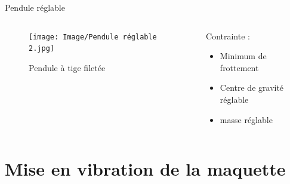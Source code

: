 \documentclass{beamer}
\begin{document}
\begin{frame}{Pendule réglable}
	\begin{columns}
		
	\begin{column}{0.35\textwidth}
		
	
	\begin{figure}
		\texttt{[image: Image/Pendule réglable 2.jpg]}
		\caption{Pendule à tige filetée}
	\end{figure}
\end{column}
\begin{column}{0.65\textwidth}
	Contrainte : 
	\begin{itemize}
		\item Minimum de frottement
		\item Centre de gravité réglable
		\item masse réglable
	\end{itemize}
\end{column}
\end{columns}
\end{frame}
\section{Mise en vibration de la maquette}
\end{document}
